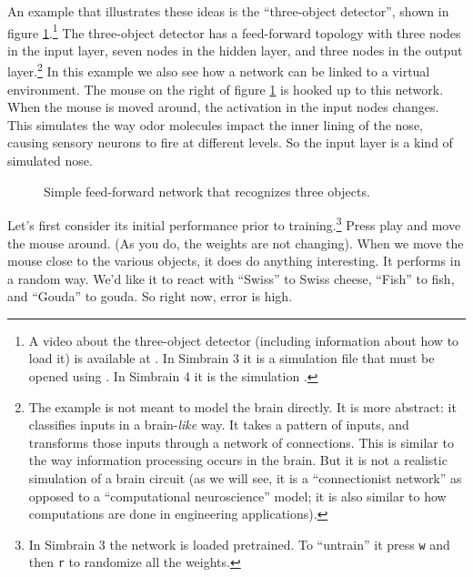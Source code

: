 An example that illustrates these ideas is the ``three-object detector'',  shown in figure \ref{3ObjectClassifier}.\footnote{A video about the three-object detector (including information about how to load it) is available at . In Simbrain 3 it is a simulation file that must be opened using . In Simbrain 4 it is the simulation .} The three-object detector has a feed-forward topology with three nodes in the input layer, seven nodes in the hidden layer, and three nodes in the output layer.\footnote{The example is not meant to model the brain directly. It is more abstract:  it classifies inputs in a  brain-\emph{like} way. It takes a pattern of inputs, and transforms those inputs through a network of connections. This is similar to the way information processing occurs in the brain. But it is not a realistic simulation of a brain circuit (as we will see, it is a ``connectionist network'' as opposed to a ``computational neuroscience'' model; it is also similar to how computations are done in engineering applications).} In this example we also see how a network can be linked to a virtual environment. The mouse on the right of figure \ref{3ObjectClassifier} is hooked up to this network. When the mouse is moved around, the activation in the input nodes changes. This simulates the way odor molecules impact the inner lining of the nose, causing sensory neurons to fire at different levels. So the input layer is a kind of simulated nose. 
\begin{figure}[h]
\centering
{}
\caption[Simbrain screenshot.]{Simple feed-forward network that recognizes three objects.}
\label{3ObjectClassifier}
\end{figure}

Let's first consider its initial performance prior to training.\footnote{In Simbrain 3 the network is loaded pretrained. To ``untrain'' it  press \texttt{w} and then \texttt{r} to randomize all the weights.} Press play and move the mouse around. (As you do, the weights are not changing). When we move the mouse close to the various objects, it does do anything interesting. It performs in a random way.  We'd like it to react with ``Swiss'' to Swiss cheese, ``Fish'' to fish, and ``Gouda'' to gouda.  So right now, error is high. 

